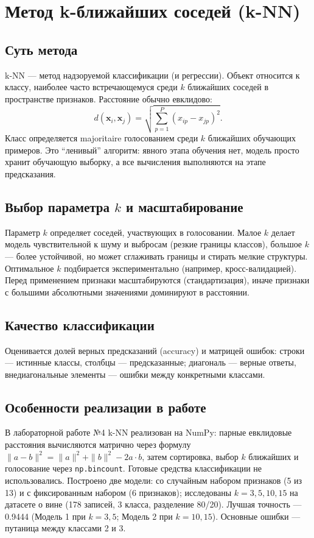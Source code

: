 \documentclass[12pt,a4paper]{article}
\begin{document}
\section{Метод k-ближайших соседей (k-NN)}

\subsection{Суть метода}
k-NN --- метод надзоруемой классификации (и регрессии). Объект относится к классу, наиболее часто встречающемуся среди $k$ ближайших соседей в пространстве признаков. Расстояние обычно евклидово:
\begin{equation}
d(\mathbf{x}_i, \mathbf{x}_j) = \sqrt{\sum_{p=1}^{P} (x_{ip} - x_{jp})^2}.
\end{equation}
Класс определяется majoritaire голосованием среди $k$ ближайших обучающих примеров. Это ``ленивый'' алгоритм: явного этапа обучения нет, модель просто хранит обучающую выборку, а все вычисления выполняются на этапе предсказания.

\subsection{Выбор параметра $k$ и масштабирование}
Параметр $k$ определяет соседей, участвующих в голосовании. Малое $k$ делает модель чувствительной к шуму и выбросам (резкие границы классов), большое $k$ --- более устойчивой, но может сглаживать границы и стирать мелкие структуры. Оптимальное $k$ подбирается экспериментально (например, кросс-валидацией). Перед применением признаки масштабируются (стандартизация), иначе признаки с большими абсолютными значениями доминируют в расстоянии.

\subsection{Качество классификации}
Оценивается долей верных предсказаний (accuracy) и матрицей ошибок: строки --- истинные классы, столбцы --- предсказанные; диагональ --- верные ответы, внедиагональные элементы --- ошибки между конкретными классами.

\subsection{Особенности реализации в работе}
В лабораторной работе №4 k-NN реализован на NumPy: парные евклидовые расстояния вычисляются матрично через формулу $\|a-b\|^2=\|a\|^2+\|b\|^2-2a\cdot b$, затем сортировка, выбор $k$ ближайших и голосование через \texttt{np.bincount}. Готовые средства классификации не использовались. Построено две модели: со случайным набором признаков (5 из 13) и с фиксированным набором (6 признаков); исследованы $k=3,5,10,15$ на датасете о вине (178 записей, 3 класса, разделение 80/20). Лучшая точность --- 0.9444 (Модель 1 при $k=3,5$; Модель 2 при $k=10,15$). Основные ошибки --- путаница между классами 2 и 3.
\end{document}
